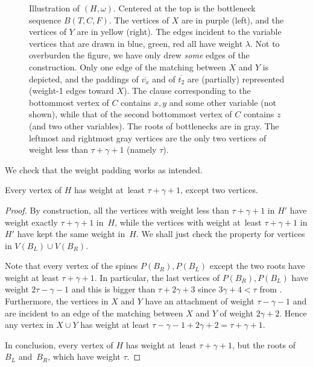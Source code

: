 \documentclass[a4paper,UKenglish,cleveref,hyperref,autoref]{lipics-v2021}
\begin{document}
\begin{figure}[h!]
{
}
\caption{Illustration of $(H, \omega)$.
  Centered at the top is the bottleneck sequence $B(T, C, F)$.
  The vertices of $X$ are in purple (left), and the vertices of $Y$ are in yellow (right).
  The edges incident to the variable vertices that are drawn in blue, green, red all have weight $\lambda$.
  Not to overburden the figure, we have only drew \emph{some} edges of the construction.
  Only one edge of the matching between $X$ and $Y$ is depicted, and the paddings of $\overline{v_x}$ and of $\overline{t_2}$ are (partially) represented (weight-1 edges toward $X$).
  The clause corresponding to the bottommost vertex of $C$ contains $x, y$ and some other variable (not shown), while that of the second bottommost vertex of $C$ contains $z$ (and two other variables).
  The roots of bottlenecks are in gray.
  The leftmost and rightmost gray vertices are the only two vertices of weight less than $\tau+\gamma+1$ (namely $\tau$).
 }
\label{fig:first-red}
\end{figure}

\medskip

We check that the weight padding works as intended.

\begin{lemma}\label{lem:saturation}
Every vertex of $H$ has weight at~least $\tau + \gamma + 1$, except two vertices.
\end{lemma}
\begin{proof}
  By construction, all the vertices with weight less than $\tau + \gamma + 1$ in $H'$ have weight exactly $\tau + \gamma + 1$ in~$H$, while the vertices with weight at~least $\tau + \gamma + 1$ in $H'$ have kept the same weight in~$H$.
  We shall just check the property for vertices in $V(B_L) \cup V(B_R)$.

  Note that every vertex of the spines $P(B_R), P(B_L)$ except the two roots have weight at least $\tau + \gamma + 1$.
  In particular, the last vertices of $P(B_R), P(B_L)$ have weight $2\tau -\gamma - 1$ and this is bigger than $\tau + 2\gamma +3$ since $3\gamma +4 < \tau$ from .
  Furthermore, the vertices in $X$ and $Y$ have an attachment of weight $\tau - \gamma - 1$ and are incident to an edge of the matching between $X$ and $Y$ of weight $2\gamma + 2$.
  Hence any vertex in $X \cup Y$ has weight at least $\tau - \gamma - 1 + 2\gamma + 2 = \tau + \gamma + 1$.

 In conclusion, every vertex of $H$ has weight at~least $\tau + \gamma + 1$, but the roots of~$B_L$ and~$B_R$, which have weight $\tau$.
\end{proof}
\end{document}
